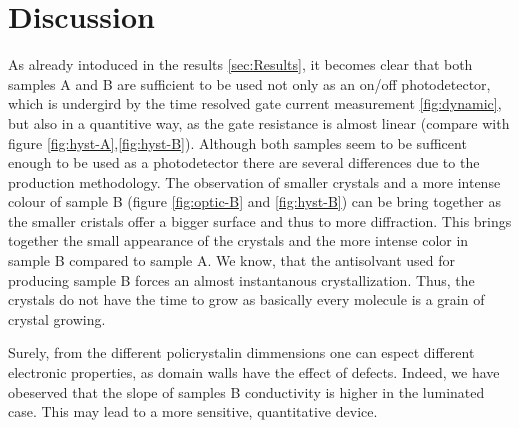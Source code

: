 \section{Discussion}
\label{sec:Discussion}


As already intoduced in the results \ref{sec:Results}, it becomes clear that both samples A and B are sufficient to be used not only as an on/off photodetector, which is undergird by the time resolved gate current measurement \ref{fig:dynamic},
but also in a quantitive way, as the gate resistance is almost linear (compare with figure \ref{fig:hyst-A},\ref{fig:hyst-B}).
Although both samples seem to be sufficent enough to be used as a photodetector there are several differences due to the production methodology.
The observation of smaller crystals and a more intense colour of sample B (figure \ref{fig:optic-B} and \ref{fig:hyst-B}) can be bring together as the smaller cristals offer a bigger surface and thus to more diffraction.
This brings together the small appearance of the crystals and the more intense color in sample B compared to sample A.
We know, that the antisolvant used for producing sample B forces an almost instantanous crystallization.
Thus, the crystals do not have the time to grow as basically every molecule is a grain of crystal growing.

Surely, from the different policrystalin dimmensions one can espect different electronic properties, as domain walls have the effect of defects.
Indeed, we have obeserved that the slope of samples B conductivity is higher in the luminated case.
This may lead to a more sensitive, quantitative device.